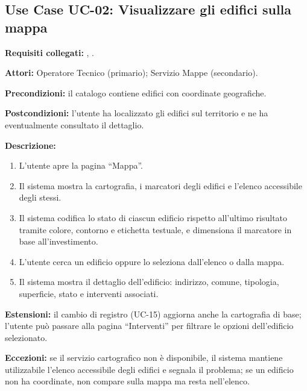 \subsection*{Use Case UC-02: Visualizzare gli edifici sulla mappa}
\textbf{Requisiti collegati:} , .\par
\textbf{Attori:} Operatore Tecnico (primario); Servizio Mappe (secondario).\par
\textbf{Precondizioni:} il catalogo contiene edifici con coordinate geografiche.\par
\textbf{Postcondizioni:} l'utente ha localizzato gli edifici sul territorio e ne ha eventualmente consultato il dettaglio.\par
\textbf{Descrizione:}
\begin{enumerate}[leftmargin=1.6em, itemsep=0.1em]
    \item L'utente apre la pagina ``Mappa''.
    \item Il sistema mostra la cartografia, i marcatori degli edifici e l'elenco accessibile degli stessi.
    \item Il sistema codifica lo stato di ciascun edificio rispetto all'ultimo risultato tramite colore, contorno e etichetta testuale, e dimensiona il marcatore in base all'investimento.
    \item L'utente cerca un edificio oppure lo seleziona dall'elenco o dalla mappa.
    \item Il sistema mostra il dettaglio dell'edificio: indirizzo, comune, tipologia, superficie, stato e interventi associati.
\end{enumerate}
\textbf{Estensioni:} il cambio di registro (UC-15) aggiorna anche la cartografia di base; l'utente può passare alla pagina ``Interventi'' per filtrare le opzioni dell'edificio selezionato.\par
\textbf{Eccezioni:} se il servizio cartografico non è disponibile, il sistema mantiene utilizzabile l'elenco accessibile degli edifici e segnala il problema; se un edificio non ha coordinate, non compare sulla mappa ma resta nell'elenco.

